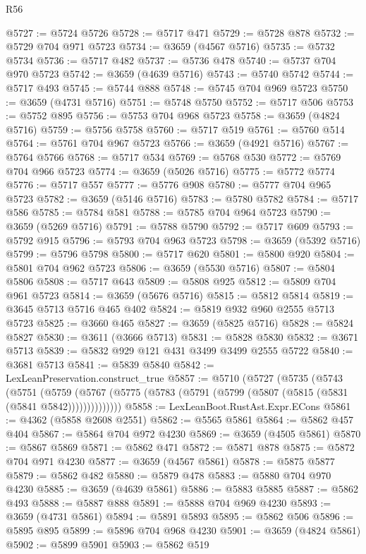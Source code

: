 \begin{lexlean}{R56}
\begin{coremodule}
@5727 := @5724 @5726
@5728 := @5717 @471
@5729 := @5728 @878
@5732 := @5729 @704 @971 @5723
@5734 := @3659 (@4567 @5716)
@5735 := @5732 @5734
@5736 := @5717 @482
@5737 := @5736 @478
@5740 := @5737 @704 @970 @5723
@5742 := @3659 (@4639 @5716)
@5743 := @5740 @5742
@5744 := @5717 @493
@5745 := @5744 @888
@5748 := @5745 @704 @969 @5723
@5750 := @3659 (@4731 @5716)
@5751 := @5748 @5750
@5752 := @5717 @506
@5753 := @5752 @895
@5756 := @5753 @704 @968 @5723
@5758 := @3659 (@4824 @5716)
@5759 := @5756 @5758
@5760 := @5717 @519
@5761 := @5760 @514
@5764 := @5761 @704 @967 @5723
@5766 := @3659 (@4921 @5716)
@5767 := @5764 @5766
@5768 := @5717 @534
@5769 := @5768 @530
@5772 := @5769 @704 @966 @5723
@5774 := @3659 (@5026 @5716)
@5775 := @5772 @5774
@5776 := @5717 @557
@5777 := @5776 @908
@5780 := @5777 @704 @965 @5723
@5782 := @3659 (@5146 @5716)
@5783 := @5780 @5782
@5784 := @5717 @586
@5785 := @5784 @581
@5788 := @5785 @704 @964 @5723
@5790 := @3659 (@5269 @5716)
@5791 := @5788 @5790
@5792 := @5717 @609
@5793 := @5792 @915
@5796 := @5793 @704 @963 @5723
@5798 := @3659 (@5392 @5716)
@5799 := @5796 @5798
@5800 := @5717 @620
@5801 := @5800 @920
@5804 := @5801 @704 @962 @5723
@5806 := @3659 (@5530 @5716)
@5807 := @5804 @5806
@5808 := @5717 @643
@5809 := @5808 @925
@5812 := @5809 @704 @961 @5723
@5814 := @3659 (@5676 @5716)
@5815 := @5812 @5814
@5819 := @3645 @5713 @5716 @465 @402
@5824 := @5819 @932 @960 @2555 @5713 @5723
@5825 := @3660 @465
@5827 := @3659 (@5825 @5716)
@5828 := @5824 @5827
@5830 := @3611 (@3666 @5713)
@5831 := @5828 @5830
@5832 := @3671 @5713
@5839 := @5832 @929 @121 @431 @3499 @3499 @2555 @5722
@5840 := @3681 @5713
@5841 := @5839 @5840
@5842 := LexLeanPreservation.construct_true
@5857 := @5710
    (@5727
      (@5735
        (@5743
          (@5751
            (@5759
              (@5767 (@5775 (@5783 (@5791 (@5799 (@5807 (@5815 (@5831 (@5841 @5842))))))))))))))
@5858 := LexLeanBoot.RustAst.Expr.ECons
@5861 := @4362 (@5858 @2608 @2551)
@5862 := @5565 @5861
@5864 := @5862 @457 @404
@5867 := @5864 @704 @972 @4230
@5869 := @3659 (@4505 @5861)
@5870 := @5867 @5869
@5871 := @5862 @471
@5872 := @5871 @878
@5875 := @5872 @704 @971 @4230
@5877 := @3659 (@4567 @5861)
@5878 := @5875 @5877
@5879 := @5862 @482
@5880 := @5879 @478
@5883 := @5880 @704 @970 @4230
@5885 := @3659 (@4639 @5861)
@5886 := @5883 @5885
@5887 := @5862 @493
@5888 := @5887 @888
@5891 := @5888 @704 @969 @4230
@5893 := @3659 (@4731 @5861)
@5894 := @5891 @5893
@5895 := @5862 @506
@5896 := @5895 @895
@5899 := @5896 @704 @968 @4230
@5901 := @3659 (@4824 @5861)
@5902 := @5899 @5901
@5903 := @5862 @519

\end{coremodule}
\end{lexlean}
